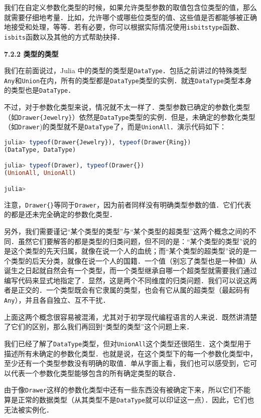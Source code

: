 我们在自定义参数化类型的时候，如果允许类型参数的取值包含位类型的值，那么就需要仔细地考量．比如，允许哪个或哪些位类型的值、这些值是否都能够被正确地接受和处理，等等．若有必要，你可以根据实际情况使用\verb|isbitstype|函数、\verb|isbits|函数以及其他的方式帮助抉择．

\textbf{7.2.2 类型的类型}

我们在前面说过，Julia 中的类型的类型是\verb|DataType|．包括之前讲过的特殊类型\verb|Any|和\verb|Union|在内，所有的类型都是\verb|DataType|类型的实例．就连\verb|DataType|类型本身的类型也是\verb|DataType|．

不过，对于参数化类型来说，情况就不太一样了．类型参数已确定的参数化类型（如\verb|Drawer{Jewelry}|）依然是\verb|DataType|类型的实例．但是，未确定的参数化类型（如\verb|Drawer|)的类型就不是\verb|DataType|了，而是\verb|UnionAll|．演示代码如下：
\begin{lstlisting}[language=julia]
julia> typeof(Drawer{Jewelry}), typeof(Drawer{Ring})
(DataType, DataType)

julia> typeof(Drawer), typeof(Drawer{})
(UnionAll, UnionAll)

julia> 
\end{lstlisting}

注意，\verb|Drawer{}|等同于\verb|Drawer|，因为前者同样没有明确类型参数的值．它们代表的都是还未完全确定的参数化类型．

另外，我们需要谨记“某个类型的类型”与“某个类型的超类型”这两个概念之间的不同．虽然它们要解答的都是类型的归类问题，但不同的是：“某个类型的类型”说的是这个类型的先天归属，就像在说一个人的血统；而“某个类型的超类型”说的是一个类型的后天分类，就像在说一个人的国籍．一个值（别忘了类型也是一种值）从诞生之日起就自然会有一个类型，而一个类型继承自哪一个超类型就需要我们通过编写代码来显式地指定了．显然，这是两个不同维度的归类问题．我们可以说这两者是正交的．一个类型既会有它隶属的类型，也会有它从属的超类型（最起码有\verb|Any|），并且各自独立、互不干扰．

上面这两个概念很容易被混淆，尤其对于初学现代编程语言的人来说．既然讲清楚了它们的区别，那么我们再回到“类型的类型”这个问题上来．

我们已经了解了\verb|DataType|类型，但对\verb|UnionAll|这个类型还很陌生．这个类型用于描述所有未确定的参数化类型．也就是说，在这个类型下的每一个参数化类型中，至少还有一个类型参数没有明确的取值．单从字面上看，我们也可以感受到，它可以代表一个参数化类型能够包含的所有确定类型的联合．

由于像\verb|Drawer|这样的参数化类型中还有一些东西没有被确定下来，所以它们不能算是正常的数据类型（从其类型不是\verb|DataType|就可以印证这一点）．因此，它们也无法被实例化．

